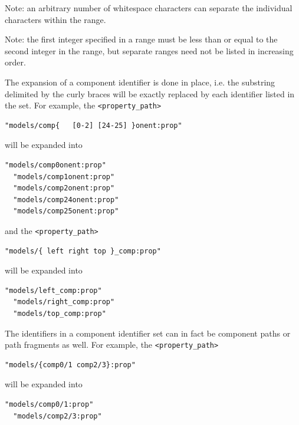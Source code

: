 \documentclass{article}
\begin{document}
\begin{sideblock}
Note: an arbitrary number of whitespace characters can separate the individual characters within the range.
\end{sideblock}

\begin{sideblock}
Note: the first integer specified in a range must be less than or equal to the second integer in the range, but separate ranges need not be listed in increasing order.
\end{sideblock}

The expansion of a component identifier is done in place, i.e. the substring delimited by the curly braces will be exactly replaced by each identifier listed in the set. For example, the {\tt <property\_path>}

\begin{lstlisting}[]
  "models/comp{   [0-2] [24-25] }onent:prop"
\end{lstlisting}

will be expanded into

\begin{lstlisting}[]
  "models/comp0onent:prop"
  "models/comp1onent:prop"
  "models/comp2onent:prop"
  "models/comp24onent:prop"
  "models/comp25onent:prop"
\end{lstlisting}

and the {\tt <property\_path>}

\begin{lstlisting}[]
  "models/{ left right top }_comp:prop"
\end{lstlisting}

will be expanded into

\begin{lstlisting}[]
  "models/left_comp:prop"
  "models/right_comp:prop"
  "models/top_comp:prop"
\end{lstlisting}

The identifiers in a component identifier set can in fact be component paths or path fragments as well. For example, the {\tt <property\_path>}

\begin{lstlisting}[]
  "models/{comp0/1 comp2/3}:prop"
\end{lstlisting}

will be expanded into

\begin{lstlisting}[]
  "models/comp0/1:prop"
  "models/comp2/3:prop"
\end{lstlisting}
\end{document}
